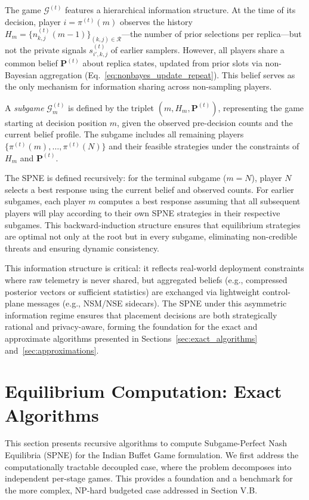 \documentclass[journal]{IEEEtran}
\theoremstyle{plain}
\theoremstyle{definition}
\theoremstyle{remark}
\begin{document}
The game $\mathcal{G}^{(t)}$ features a hierarchical information structure. At the time of its decision, player $i = \pi^{(t)}(m)$ observes the history $H_m = \{ n_{k,j}^{(t)}(m-1) \}_{(k,j)\in\mathcal{R}}$—the number of prior selections per replica—but not the private signals $s_{i',k,j}^{(t)}$ of earlier samplers. However, all players share a common belief $\mathbf{P}^{(t)}$ about replica states, updated from prior slots via non-Bayesian aggregation (Eq.~\eqref{eq:nonbayes_update_repeat}). This belief serves as the only mechanism for information sharing across non-sampling players.

A \emph{subgame} $\mathcal{G}^{(t)}_m$ is defined by the triplet $(m, H_m, \mathbf{P}^{(t)})$, representing the game starting at decision position $m$, given the observed pre-decision counts and the current belief profile. The subgame includes all remaining players $\{\pi^{(t)}(m), \dots, \pi^{(t)}(N)\}$ and their feasible strategies under the constraints of $H_m$ and $\mathbf{P}^{(t)}$.

The SPNE is defined recursively: for the terminal subgame ($m=N$), player $N$ selects a best response using the current belief and observed counts. For earlier subgames, each player $m$ computes a best response assuming that all subsequent players will play according to their own SPNE strategies in their respective subgames. This backward-induction structure ensures that equilibrium strategies are optimal not only at the root but in every subgame, eliminating non-credible threats and ensuring dynamic consistency.

This information structure is critical: it reflects real-world deployment constraints where raw telemetry is never shared, but aggregated beliefs (e.g., compressed posterior vectors or sufficient statistics) are exchanged via lightweight control-plane messages (e.g., NSM/NSE sidecars). The SPNE under this asymmetric information regime ensures that placement decisions are both strategically rational and privacy-aware, forming the foundation for the exact and approximate algorithms presented in Sections~\ref{sec:exact_algorithms} and~\ref{sec:approximations}.

\section{Equilibrium Computation: Exact Algorithms}
\label{sec:algorithms_exact}

This section presents recursive algorithms to compute Subgame-Perfect Nash Equilibria (SPNE) for the Indian Buffet Game formulation. We first address the computationally tractable decoupled case, where the problem decomposes into independent per-stage games. This provides a foundation and a benchmark for the more complex, NP-hard budgeted case addressed in Section V.B.
\end{document}
